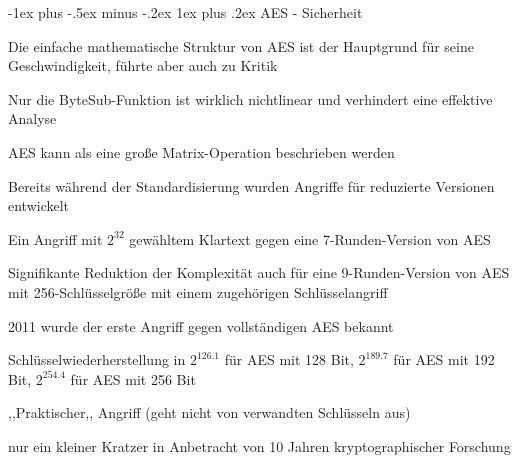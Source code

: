 \documentclass[a4paper]{article}
\makeatletter
\renewcommand{\subsubsection}{\@startsection{subsubsection}{3}{0mm}%
 {-1ex plus -.5ex minus -.2ex}%
 {1ex plus .2ex}%
 {\normalfont\small\bfseries}}
\makeatother
\begin{document}
\begin{multicols}{3}
      \subsubsection{AES - Sicherheit}
      \begin{itemize*}
            \item Die einfache mathematische Struktur von AES ist der Hauptgrund für seine Geschwindigkeit, führte aber auch zu Kritik
            \item Nur die ByteSub-Funktion ist wirklich nichtlinear und verhindert eine effektive Analyse
            \item AES kann als eine große Matrix-Operation beschrieben werden
            \item Bereits während der Standardisierung wurden Angriffe für reduzierte Versionen entwickelt
            \begin{itemize*}
                  \item Ein Angriff mit $2^{32}$ gewähltem Klartext gegen eine 7-Runden-Version von AES
                  \item Signifikante Reduktion der Komplexität auch für eine 9-Runden-Version von AES mit 256-Schlüsselgröße mit einem zugehörigen Schlüsselangriff
            \end{itemize*}
            \item 2011 wurde der erste Angriff gegen vollständigen AES bekannt
            \begin{itemize*}
                  \item Schlüsselwiederherstellung in $2^{126.1}$ für AES mit 128 Bit, $2^{189.7}$ für AES mit 192 Bit, $2^{254.4}$ für AES mit 256 Bit
                  \item ,,Praktischer,, Angriff (geht nicht von verwandten Schlüsseln aus)
                  \item nur ein kleiner Kratzer in Anbetracht von 10 Jahren kryptographischer Forschung
            \end{itemize*}
      \end{itemize*}


\end{multicols}
\end{document}
